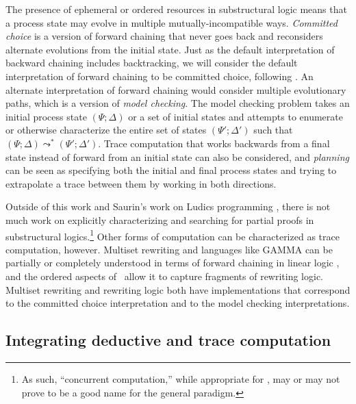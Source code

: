 The presence of ephemeral or ordered resources in substructural logic
means that a process state may evolve in multiple
mutually-incompatible ways. {\it Committed choice} is a version of
forward chaining that never goes back and reconsiders alternate
evolutions from the initial state. Just as the default interpretation
of backward chaining includes backtracking, we will consider the
default interpretation of forward chaining to be committed choice,
following \cite{lopez05monadic}.  An
alternate interpretation of forward chaining would consider multiple
evolutionary paths, which is a version of {\it model checking}.  The
model checking problem takes an initial process state $(\Psi;\Delta)$
or a set of initial states and attempts to enumerate or otherwise
characterize the entire set of states $(\Psi'; \Delta')$ such that
$(\Psi; \Delta) \leadsto^* (\Psi'; \Delta')$. Trace computation that
works backwards from a final state instead of forward from an initial
state can also be considered, and {\it planning} can be seen as
specifying both the initial and final process states and trying to
extrapolate a trace between them by working in both directions.

Outside of this work and Saurin's work on Ludics programming
\cite{saurin08towards}, there is not much work on explicitly
characterizing and searching for partial proofs in substructural
logics.\footnote{As such, ``concurrent computation,'' while
  appropriate for \sls, may or may not prove to be a good name for the
  general paradigm.}  Other forms of computation can be characterized
as trace computation, however.  Multiset rewriting and languages like
GAMMA can be partially or completely understood in terms of forward
chaining in linear logic \cite{cervesato09relating,paola96linear}, and
the ordered aspects of \sls~allow it to capture fragments of rewriting
logic. Multiset rewriting and rewriting logic both have
implementations that correspond to the committed choice interpretation
and to the model checking interpretations.  





\subsection{Integrating deductive and trace computation}

